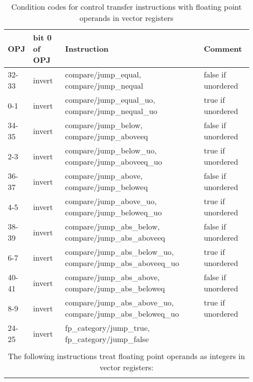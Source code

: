 \documentclass[forwardcom.tex]{subfiles}
\begin{document}
\begin{longtable}
{|p{10mm}|p{14mm}|p{65mm}|p{40mm}|}
\caption{Condition codes for control transfer instructions with floating point operands in vector registers }
\label{table:controlTransferInstructionsFloat}
\endfirsthead
\endhead
\hline
OPJ & bit 0 \newline of OPJ & Instruction & Comment \\
\hline
32-33 & invert & compare/jump\_equal, \newline compare/jump\_nequal & false if unordered \\
\hline
0-1 & invert & compare/jump\_equal\_uo, \newline compare/jump\_nequal\_uo & true if unordered \\
\hline
34-35 & invert & compare/jump\_below, \newline compare/jump\_aboveeq & false if unordered \\
\hline
2-3 & invert & compare/jump\_below\_uo, \newline compare/jump\_aboveeq\_uo & true if unordered \\
\hline
36-37 & invert & compare/jump\_above, \newline compare/jump\_beloweq & false if unordered \\
\hline
4-5 & invert & compare/jump\_above\_uo, \newline compare/jump\_beloweq\_uo & true if unordered \\
\hline
38-39 & invert & compare/jump\_abs\_below, \newline compare/jump\_abs\_aboveeq & false if unordered \\
\hline
6-7 & invert & compare/jump\_abs\_below\_uo, \newline compare/jump\_abs\_aboveeq\_uo & true if unordered \\
\hline
40-41 & invert & compare/jump\_abs\_above, \newline compare/jump\_abs\_beloweq & false if unordered \\
\hline
8-9 & invert & compare/jump\_abs\_above\_uo, \newline compare/jump\_abs\_beloweq\_uo & true if unordered \\
\hline
24-25 & invert & fp\_category/jump\_true, \newline fp\_category/jump\_false &  \\
\hline


\multicolumn{4}{|c|}{} \\
\multicolumn{4}{|c|}{ The following instructions treat floating point operands as integers in vector registers: } \\
\multicolumn{4}{|c|}{} \\
\hline


\end{longtable}
\end{document}
